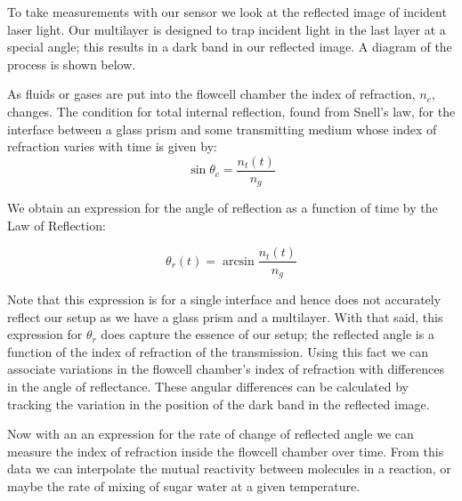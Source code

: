 \begin{flushleft}
	\hspace{0.25in}
	To take measurements with our sensor we look at the reflected image of incident laser light. Our multilayer is designed to trap incident light in the last layer at a special angle; this results in a dark band in our reflected image. A diagram of the process is shown below.
	
	\hspace{0.25in}
	As fluids or gases are put into the flowcell chamber the index of refraction, $n_c$, changes. The condition for total internal reflection, found from Snell's law, for the interface between a glass prism and some transmitting medium whose index of refraction varies with time is given by:
	\[
			\sin{\theta_c} = \frac{n_t(t)}{n_g}
	\]

	We obtain an expression for the angle of reflection as a function of time by the Law of Reflection:

	\[
			\theta_r(t) = \arcsin{\frac{n_t(t)}{n_g}}
	\]

	\hspace{0.25in}
	Note that this expression is for a single interface and hence does not accurately reflect our setup as we have a glass prism and a multilayer. With that said, this expression for $\theta_r$ does capture the essence of our setup; the reflected angle is a function of the index of refraction of the transmission. Using this fact we can associate variations in the flowcell chamber's index of refraction with differences in the angle of reflectance. These angular differences can be calculated by tracking the variation in the position of the dark band in the reflected image.

	\hspace{0.25in}
	Now with an an expression for the rate of change of reflected angle we can measure the index of refraction inside the flowcell chamber over time. From this data we can interpolate the mutual reactivity between molecules in a reaction, or maybe the rate of mixing of sugar water at a given temperature.

	\pagestyle{empty}
\end{flushleft}
